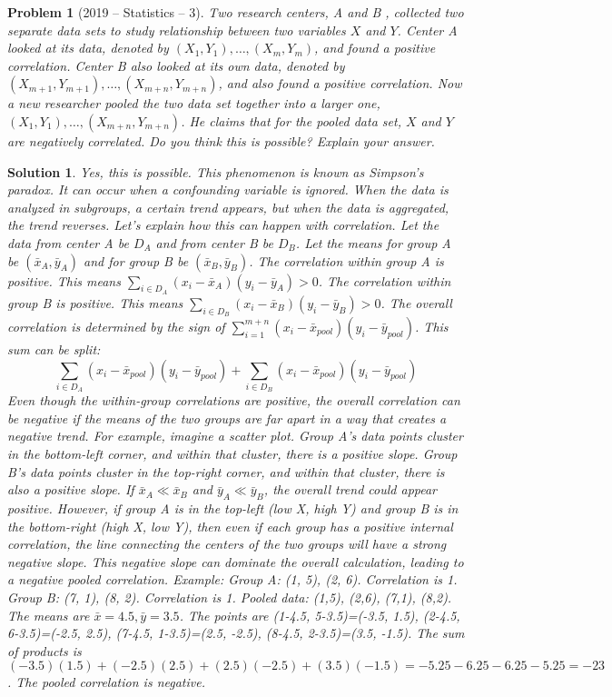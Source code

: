 \documentclass[12pt]{amsart}
\newtheorem{problem}{Problem}
\newtheorem*{solution}{Solution}
\begin{document}
\begin{problem}[2019 -- Statistics -- 3]
Two research centers, A and B , collected two separate data sets to study relationship between two variables $X$ and $Y$. Center A looked at its data, denoted by $(X_1, Y_1), \ldots,(X_m, Y_m)$, and found a positive correlation. Center B also looked at its own data, denoted by $(X_{m+1}, Y_{m+1}), \ldots,(X_{m+n}, Y_{m+n})$, and also found a positive correlation. Now a new researcher pooled the two data set together into a larger one, $(X_1, Y_1), \ldots,(X_{m+n}, Y_{m+n})$. He claims that for the pooled data set, $X$ and $Y$ are negatively correlated. Do you think this is possible? Explain your answer.
\end{problem}
\begin{solution}
Yes, this is possible. This phenomenon is known as Simpson's paradox. It can occur when a confounding variable is ignored. When the data is analyzed in subgroups, a certain trend appears, but when the data is aggregated, the trend reverses.
Let's explain how this can happen with correlation. Let the data from center A be $D_A$ and from center B be $D_B$. Let the means for group A be $(\bar{x}_A, \bar{y}_A)$ and for group B be $(\bar{x}_B, \bar{y}_B)$.
The correlation within group A is positive. This means $\sum_{i \in D_A} (x_i - \bar{x}_A)(y_i - \bar{y}_A) > 0$.
The correlation within group B is positive. This means $\sum_{i \in D_B} (x_i - \bar{x}_B)(y_i - \bar{y}_B) > 0$.
The overall correlation is determined by the sign of $\sum_{i=1}^{m+n} (x_i - \bar{x}_{pool})(y_i - \bar{y}_{pool})$.
This sum can be split:
$$ \sum_{i \in D_A} (x_i - \bar{x}_{pool})(y_i - \bar{y}_{pool}) + \sum_{i \in D_B} (x_i - \bar{x}_{pool})(y_i - \bar{y}_{pool}) $$
Even though the within-group correlations are positive, the overall correlation can be negative if the means of the two groups are far apart in a way that creates a negative trend.
For example, imagine a scatter plot. Group A's data points cluster in the bottom-left corner, and within that cluster, there is a positive slope. Group B's data points cluster in the top-right corner, and within that cluster, there is also a positive slope.
If $\bar{x}_A \ll \bar{x}_B$ and $\bar{y}_A \ll \bar{y}_B$, the overall trend could appear positive.
However, if group A is in the top-left (low X, high Y) and group B is in the bottom-right (high X, low Y), then even if each group has a positive internal correlation, the line connecting the centers of the two groups will have a strong negative slope. This negative slope can dominate the overall calculation, leading to a negative pooled correlation.
Example:
Group A: (1, 5), (2, 6). Correlation is 1.
Group B: (7, 1), (8, 2). Correlation is 1.
Pooled data: (1,5), (2,6), (7,1), (8,2). The means are $\bar{x}=4.5, \bar{y}=3.5$.
The points are (1-4.5, 5-3.5)=(-3.5, 1.5), (2-4.5, 6-3.5)=(-2.5, 2.5), (7-4.5, 1-3.5)=(2.5, -2.5), (8-4.5, 2-3.5)=(3.5, -1.5).
The sum of products is $(-3.5)(1.5) + (-2.5)(2.5) + (2.5)(-2.5) + (3.5)(-1.5) = -5.25 - 6.25 - 6.25 - 5.25 = -23$.
The pooled correlation is negative.
\end{solution}
\end{document}
